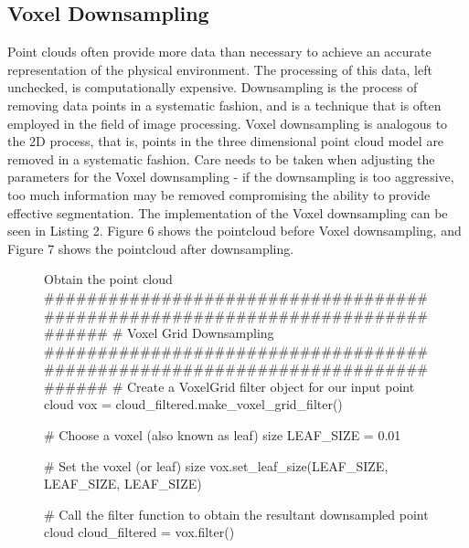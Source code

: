 \documentclass[a4paper]{article}
\begin{document}
\newpage

\subsection{Voxel Downsampling}
Point clouds often provide more data than necessary to achieve an accurate representation of the physical environment. The processing of this data, left unchecked, is computationally expensive. Downsampling is the process of removing data points in a systematic fashion, and is a technique that is often employed in the field of image processing. Voxel downsampling is analogous to the 2D process, that is, points in the three dimensional point cloud model are removed in a systematic fashion. Care needs to be taken when adjusting the parameters for the Voxel downsampling - if the downsampling is too aggressive, too much information may be removed compromising the ability to provide effective segmentation. The implementation of the Voxel downsampling can be seen in Listing 2. Figure 6 shows the pointcloud before Voxel downsampling, and Figure 7 shows the pointcloud after downsampling.

\vspace{1cm}

\begin{figure}[h]\scriptsize
\begin{sexylisting}{Obtain the point cloud}
##############################################################################
    # Voxel Grid Downsampling
##############################################################################
    # Create a VoxelGrid filter object for our input point cloud
    vox = cloud_filtered.make_voxel_grid_filter()

    # Choose a voxel (also known as leaf) size
    LEAF_SIZE = 0.01

    # Set the voxel (or leaf) size
    vox.set_leaf_size(LEAF_SIZE, LEAF_SIZE, LEAF_SIZE)

    # Call the filter function to obtain the resultant downsampled point cloud
    cloud_filtered = vox.filter()
\end{sexylisting}
\end{figure}

\vspace{1cm}
\end{document}
